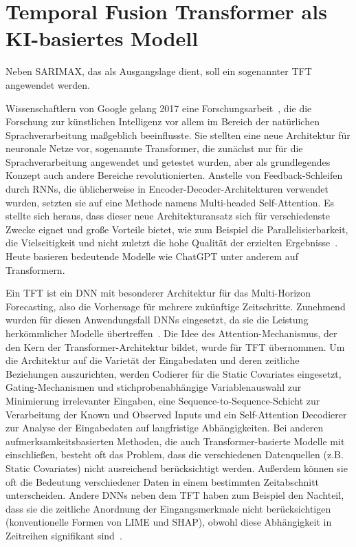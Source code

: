 \section{Temporal Fusion Transformer als KI-basiertes Modell}
Neben SARIMAX, das als Ausgangslage dient, soll ein sogenannter \ac{TFT} angewendet werden.

Wissenschaftlern von Google gelang 2017 eine Forschungsarbeit~\cite{Vaswani.2017}, die die Forschung zur künstlichen Intelligenz vor allem im Bereich der natürlichen Sprachverarbeitung maßgeblich beeinflusste.
Sie stellten eine neue Architektur für neuronale Netze vor, sogenannte Transformer, die zunächst nur für die Sprachverarbeitung angewendet und getestet wurden, aber als grundlegendes Konzept auch andere Bereiche revolutionierten.
Anstelle von Feedback-Schleifen durch \ac{RNN}s, die üblicherweise in Encoder-Decoder-Architekturen verwendet wurden, setzten sie auf eine Methode namens \glqq Multi-headed Self-Attention\grqq{}.
Es stellte sich heraus, dass dieser neue Architekturansatz sich für verschiedenste Zwecke eignet und große Vorteile bietet, wie zum Beispiel die Parallelisierbarkeit, die Vielseitigkeit und nicht zuletzt die hohe Qualität der erzielten Ergebnisse~\cite{Vaswani.2017}.
Heute basieren bedeutende Modelle wie ChatGPT unter anderem auf Transformern.

Ein \ac{TFT} ist ein \ac{DNN} mit besonderer Architektur für das Multi-Horizon Forecasting, also die Vorhersage für mehrere zukünftige Zeitschritte.
Zunehmend wurden für diesen Anwendungsfall \ac{DNN}s eingesetzt, da sie die Leistung herkömmlicher Modelle übertreffen~\cite{Lim.19.12.2019}.
Die Idee des Attention-Mechanismus, der den Kern der Transformer-Architektur bildet, wurde für \ac{TFT} übernommen.
Um die Architektur auf die Varietät der Eingabedaten und deren zeitliche Beziehungen auszurichten, werden Codierer für die Static Covariates eingesetzt, Gating-Mechanismen und stichprobenabhängige Variablenauswahl zur Minimierung irrelevanter Eingaben, eine Sequence-to-Sequence-Schicht zur Verarbeitung der Known und Observed Inputs und ein Self-Attention Decodierer zur Analyse der Eingabedaten auf langfristige Abhängigkeiten.
Bei anderen aufmerksamkeitsbasierten Methoden, die auch Transformer-basierte Modelle mit einschließen, besteht oft das Problem, dass die verschiedenen Datenquellen (z.B. Static Covariates) nicht ausreichend berücksichtigt werden.
Außerdem können sie oft die Bedeutung verschiedener Daten in einem bestimmten Zeitabschnitt unterscheiden.
Andere \ac{DNN}s neben dem \ac{TFT} haben zum Beispiel den Nachteil, dass sie die zeitliche Anordnung der Eingangsmerkmale nicht berücksichtigen (konventionelle Formen von LIME und SHAP), obwohl diese Abhängigkeit in Zeitreihen signifikant sind~\cite{Lim.19.12.2019}.

